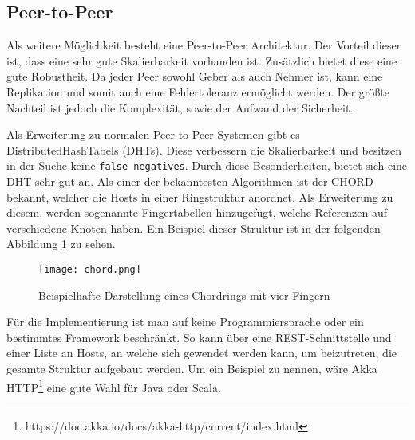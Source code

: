 \subsection{Peer-to-Peer}

Als weitere Möglichkeit besteht eine Peer-to-Peer Architektur. Der Vorteil dieser ist, dass eine sehr gute Skalierbarkeit vorhanden ist. Zusätzlich bietet diese eine gute Robustheit. Da jeder Peer sowohl Geber als auch Nehmer ist, kann eine Replikation und somit auch eine Fehlertoleranz ermöglicht werden. Der größte Nachteil ist jedoch die Komplexität, sowie der Aufwand der Sicherheit.

Als Erweiterung zu normalen Peer-to-Peer Systemen gibt es DistributedHashTabels (DHTs). Diese verbessern die Skalierbarkeit und besitzen in der Suche keine \verb|false negatives|. Durch diese Besonderheiten, bietet sich eine DHT sehr gut an. Als einer der bekanntesten Algorithmen ist der CHORD bekannt, welcher die Hosts in einer Ringstruktur anordnet. Als Erweiterung zu diesem, werden sogenannte Fingertabellen hinzugefügt, welche Referenzen auf verschiedene Knoten haben. Ein Beispiel dieser Struktur ist in der folgenden Abbildung \ref{fig:chord} zu sehen.

\begin{figure}[h]
    \centering
    \texttt{[image: chord.png]}
    \caption{}{Beispielhafte Darstellung eines Chordrings mit vier Fingern\footnotemark}
    \label{fig:chord}
\end{figure}

Für die Implementierung ist man auf keine Programmiersprache oder ein bestimmtes Framework beschränkt. So kann über eine REST-Schnittstelle und einer Liste an Hosts, an welche sich gewendet werden kann, um beizutreten, die gesamte Struktur aufgebaut werden. Um ein Beispiel zu nennen, wäre Akka HTTP\footnote{https://doc.akka.io/docs/akka-http/current/index.html} eine gute Wahl für Java oder Scala.
